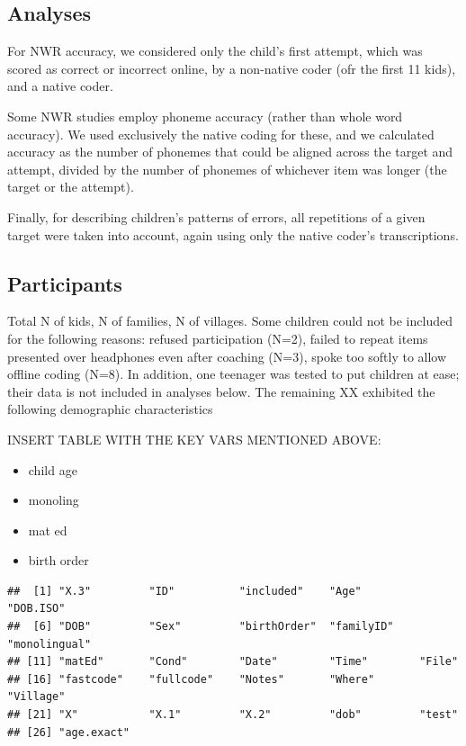 \documentclass[english,,man,floatsintext]{apa6}
\providecommand{\tightlist}{%
  \setlength{\itemsep}{0pt}\setlength{\parskip}{0pt}}
\begin{document}
\hypertarget{analyses}{%
\subsection{Analyses}\label{analyses}}

For NWR accuracy, we considered only the child's first attempt, which was scored as correct or incorrect online, by a non-native coder (ofr the first 11 kids), and a native coder.

Some NWR studies employ phoneme accuracy (rather than whole word accuracy). We used exclusively the native coding for these, and we calculated accuracy as the number of phonemes that could be aligned across the target and attempt, divided by the number of phonemes of whichever item was longer (the target or the attempt).

Finally, for describing children's patterns of errors, all repetitions of a given target were taken into account, again using only the native coder's transcriptions.

\hypertarget{participants}{%
\subsection{Participants}\label{participants}}

Total N of kids, N of families, N of villages. Some children could not be included for the following reasons: refused participation (N=2), failed to repeat items presented over headphones even after coaching (N=3), spoke too softly to allow offline coding (N=8). In addition, one teenager was tested to put children at ease; their data is not included in analyses below. The remaining XX exhibited the following demographic characteristics

INSERT TABLE WITH THE KEY VARS MENTIONED ABOVE:

\begin{itemize}
\tightlist
\item
  child age
\item
  monoling
\item
  mat ed
\item
  birth order
\end{itemize}

\begin{verbatim}
##  [1] "X.3"         "ID"          "included"    "Age"         "DOB.ISO"    
##  [6] "DOB"         "Sex"         "birthOrder"  "familyID"    "monolingual"
## [11] "matEd"       "Cond"        "Date"        "Time"        "File"       
## [16] "fastcode"    "fullcode"    "Notes"       "Where"       "Village"    
## [21] "X"           "X.1"         "X.2"         "dob"         "test"       
## [26] "age.exact"
\end{verbatim}
\end{document}
